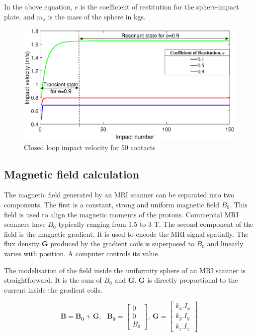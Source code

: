 \documentclass[letterpaper, 10 pt, conference]{ieeeconf}  %
\begin{document}
In the above equation, $e$ is the coefficient of restitution for the sphere-impact plate, and $m_s$ is the mass of the sphere in kgs.
\begin{figure}
	\includegraphics[width=\linewidth]{Closedloop_Impact_velocity.eps}
	\caption{Closed loop impact velocity for 50 contacts}
	\label{Closedloop_Impact_velocity}
	
\end{figure}

\subsection{Magnetic field calculation}

The magnetic field generated by an MRI scanner can be separated into two components. The first is a constant, strong and uniform magnetic field $B_0$. This field is used to align the magnetic moments of the protons. Commercial MRI scanners have $B_0$ typically ranging from 1.5 to 3 T. The second component of the field is the magnetic gradient. It is used to encode the MRI signal spatially. The flux density $\mathbf{G}$ produced by the gradient coils is superposed to $B_0$ and linearly varies with position. A computer controls its value.\par
The modelisation of the field inside the uniformity sphere of an MRI scanner is straightforward. It is the sum of $B_0$ and $\mathbf{G}$. $\mathbf{G}$ is directly proportional to the current inside the gradient coils. 

\begin{equation}
\mathbf{B}=\mathbf{B_0}+\mathbf{G},~~~
\mathbf{B_0}=\begin{bmatrix}
0\\ 
0\\ 
B_0
\end{bmatrix},~
\mathbf{G}=\begin{bmatrix}
k_x.I_x\\ 
k_y.I_y\\ 
k_z.I_z
\end{bmatrix}
\end{equation}
\end{document}
